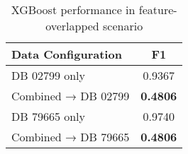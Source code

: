 \begin{table}[ht]
  \centering
  \caption{XGBoost performance in feature-overlapped scenario}
  \label{tab:xgboost_feature_overlap}
  \begin{tabular}{lc}
  \toprule
  \textbf{Data Configuration} & \textbf{F1} \\
  \midrule
  DB 02799 only & 0.9367 \\
  Combined → DB 02799 & \textbf{0.4806} \\
  \midrule
  DB 79665 only & 0.9740 \\
  Combined → DB 79665 & \textbf{0.4806} \\
  \bottomrule
  \end{tabular}
\end{table}